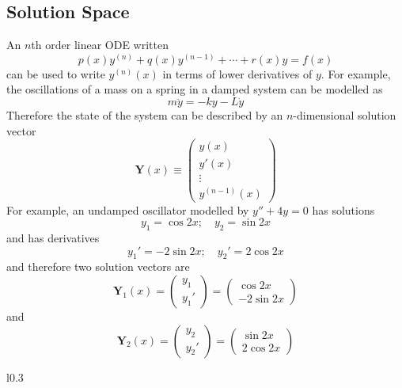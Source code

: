 \documentclass{article}
\begin{document}
\subsection{Solution Space}
An $n$th order linear ODE written
\[ p(x)y^{(n)} + q(x) y^{(n-1)} + \cdots + r(x)y = f(x) \]
can be used to write $y^{(n)}(x)$ in terms of lower derivatives of $y$. For example, the oscillations of a mass on a spring in a damped system can be modelled as
\[ m\ddot y = -k y - L\dot y \]
Therefore the state of the system can be described by an $n$-dimensional solution vector
\begin{equation}
	\bm Y(x) \equiv \begin{pmatrix}
		y(x) \\ y'(x) \\ \vdots \\ y^{(n-1)}(x)
	\end{pmatrix}
\end{equation}
For example, an undamped oscillator modelled by $y'' + 4y = 0$ has solutions
\[ y_1 = \cos 2x;\quad y_2 = \sin 2x \]
and has derivatives
\[ y_1' = -2\sin 2x;\quad y_2' = 2\cos 2x \]
and therefore two solution vectors are
\[
	\bm Y_1(x) = \begin{pmatrix}
		y_1 \\ y_1'
	\end{pmatrix} = \begin{pmatrix}
		\cos 2x \\ -2 \sin 2x
	\end{pmatrix}
\]
and
\[
	\bm Y_2(x) = \begin{pmatrix}
		y_2 \\ y_2'
	\end{pmatrix} = \begin{pmatrix}
		\sin 2x \\ 2 \cos 2x
	\end{pmatrix}
\]

\begin{wrapfigure}{l}{0.3\textwidth}
\end{wrapfigure}
\end{document}
